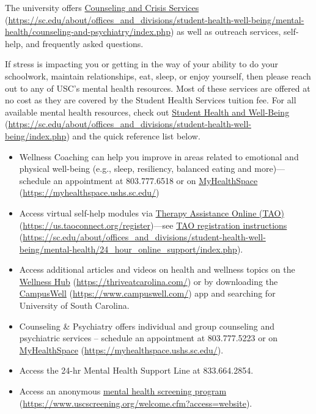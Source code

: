 \documentclass[11pt,letterpaper]{article}
\begin{document}

The university offers \href{https://sc.edu/about/offices\_and\_divisions/student-health-well-being/mental-health/counseling-and-psychiatry/index.php}{Counseling and Crisis Services} (\url{https://sc.edu/about/offices\_and\_divisions/student-health-well-being/mental-health/counseling-and-psychiatry/index.php}) as well as outreach services, self-help, and frequently asked questions. \pspace

If stress is impacting you or getting in the way of your ability to do your schoolwork, maintain relationships, eat, sleep, or enjoy yourself, then please reach out to any of USC's mental health resources. Most of these services are offered at no cost as they are covered by the Student Health Services tuition fee. For all available mental health resources, check out \href{https://sc.edu/about/offices\_and\_divisions/student-health-well-being/index.php}{Student Health and Well-Being} (\url{https://sc.edu/about/offices\_and\_divisions/student-health-well-being/index.php}) and the quick reference list below. 
	\begin{itemize}
	\item Wellness Coaching can help you improve in areas related to emotional and physical well-being (e.g., sleep, resiliency, balanced eating and more)---schedule an appointment at 803.777.6518 or on \href{https://myhealthspace.ushs.sc.edu/}{MyHealthSpace} (\url{https://myhealthspace.ushs.sc.edu/})
	
	\item Access virtual self-help modules via \href{https://us.taoconnect.org/register}{Therapy Assistance Online (TAO)} (\url{https://us.taoconnect.org/register})---see \href{https://sc.edu/about/offices\_and\_divisions/student-health-well-being/mental-health/24\_hour\_online\_support/index.php}{TAO registration instructions} (\url{https://sc.edu/about/offices\_and\_divisions/student-health-well-being/mental-health/24\_hour\_online\_support/index.php}).
	
	\item Access additional articles and videos on health and wellness topics on the \href{https://thriveatcarolina.com/}{Wellness Hub} (\url{https://thriveatcarolina.com/}) or by downloading the \href{https://www.campuswell.com/}{CampusWell} (\url{https://www.campuswell.com/}) app and searching for University of South Carolina.
	
	\item Counseling \& Psychiatry offers individual and group counseling and psychiatric services – schedule an appointment at 803.777.5223 or on \href{https://myhealthspace.ushs.sc.edu/}{MyHealthSpace} (\url{https://myhealthspace.ushs.sc.edu/}).
	
	\item Access the 24-hr Mental Health Support Line at 833.664.2854.
	
	\item Access an anonymous \href{https://www.uscscreening.org/welcome.cfm?access=website}{mental health screening program} (\url{https://www.uscscreening.org/welcome.cfm?access=website}).
	\end{itemize} \sectionbreak
\end{document}
